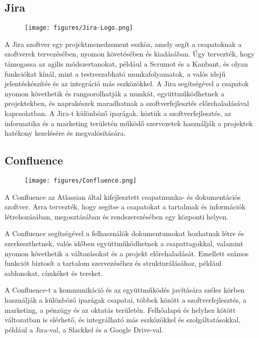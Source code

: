\subsection*{Jira}
\begin{figure}[H]
    \centering
    \texttt{[image: figures/Jira-Logo.png]}
\end{figure}
\par A Jira szoftver egy projektmenedzsment eszköz, amely segít a csapatoknak a szoftverek tervezésében, nyomon követésében és kiadásában. Úgy tervezték, hogy támogassa az agilis módszertanokat, például a Scrumot és a Kanbant, és olyan funkciókat kínál, mint a testreszabható munkafolyamatok, a valós idejű jelentéskészítés és az integráció más eszközökkel. A Jira segítségével a csapatok nyomon követhetik és rangsorolhatják a munkát, együttműködhetnek a projektekben, és naprakészek maradhatnak a szoftverfejlesztés előrehaladásával kapcsolatban. A Jira-t különböző iparágak, köztük a szoftverfejlesztés, az informatika és a marketing területén működő szervezetek használják a projektek hatékony kezelésére és megvalósítására.
\subsection*{Confluence}
\begin{figure}[H]
    \centering
    \texttt{[image: figures/Confluence.png]}
\end{figure}
\par A Confluence az Atlassian által kifejlesztett csapatmunka- és dokumentációs szoftver. Arra tervezték, hogy segítse a csapatokat a tartalmak és információk létrehozásában, megosztásában és rendszerezésében egy központi helyen.
\par A Confluence segítségével a felhasználók dokumentumokat hozhatnak létre és szerkeszthetnek, valós időben együttműködhetnek a csapattagokkal, valamint nyomon követhetik a változásokat és a projekt előrehaladását. Emellett számos funkciót biztosít a tartalom szervezéséhez és strukturálásához, például sablonokat, címkéket és tereket.
\par A Confluence-t a kommunikáció és az együttműködés javítására széles körben használják a különböző iparágak csapatai, többek között a szoftverfejlesztés, a marketing, a pénzügy és az oktatás területén. Felhőalapú és helyhez kötött változatban is elérhető, és integrálható más eszközökkel és szolgáltatásokkal, például a Jira-val, a Slackkel és a Google Drive-val.
